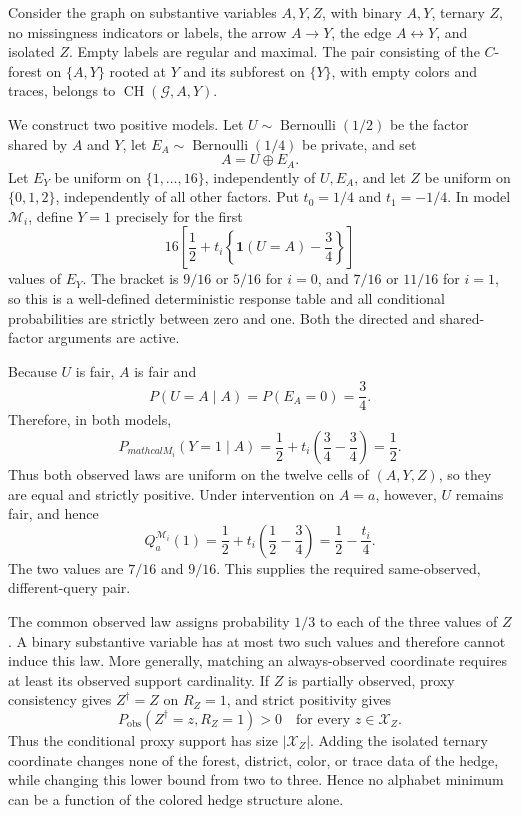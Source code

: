 Consider the graph on substantive variables \(A,Y,Z\), with binary \(A,Y\), ternary \(Z\), no missingness indicators or labels, the arrow \(A\to Y\), the edge \(A\leftrightarrow Y\), and isolated \(Z\). Empty labels are regular and maximal. The pair consisting of the \(C\)-forest on \(\{A,Y\}\) rooted at \(Y\) and its subforest on \(\{Y\}\), with empty colors and traces, belongs to \(\operatorname{CH}(\mathcal G,A,Y)\).

We construct two positive models. Let \(U\sim\operatorname{Bernoulli}(1/2)\) be the factor shared by \(A\) and \(Y\), let \(E_A\sim\operatorname{Bernoulli}(1/4)\) be private, and set
\[
A=U\mathbin{\oplus}E_A.
\]
Let \(E_Y\) be uniform on \(\{1,\ldots,16\}\), independently of \(U,E_A\), and let \(Z\) be uniform on \(\{0,1,2\}\), independently of all other factors. Put \(t_0=1/4\) and \(t_1=-1/4\). In model \(\mathcal M_i\), define \(Y=1\) precisely for the first
\[
16\left[\frac12+t_i\left\{\mathbf 1(U=A)-\frac34\right\}\right]
\]
values of \(E_Y\). The bracket is \(9/16\) or \(5/16\) for \(i=0\), and \(7/16\) or \(11/16\) for \(i=1\), so this is a well-defined deterministic response table and all conditional probabilities are strictly between zero and one. Both the directed and shared-factor arguments are active.

Because \(U\) is fair, \(A\) is fair and
\[
P(U=A\mid A)=P(E_A=0)=\frac34.
\]
Therefore, in both models,
\[
P_{mathcal M_i}(Y=1\mid A)
=\frac12+t_i\left(\frac34-\frac34\right)=\frac12.
\]
Thus both observed laws are uniform on the twelve cells of \((A,Y,Z)\), so they are equal and strictly positive. Under intervention on \(A=a\), however, \(U\) remains fair, and hence
\[
Q_a^{\mathcal M_i}(1)
=\frac12+t_i\left(\frac12-\frac34\right)
=\frac12-\frac{t_i}{4}.
\]
The two values are \(7/16\) and \(9/16\). This supplies the required same-observed, different-query pair.

The common observed law assigns probability \(1/3\) to each of the three values of \(Z\). A binary substantive variable has at most two such values and therefore cannot induce this law. More generally, matching an always-observed coordinate requires at least its observed support cardinality. If \(Z\) is partially observed, proxy consistency gives \(Z^{\dagger}=Z\) on \(R_Z=1\), and strict positivity gives
\[
P_{\mathrm{obs}}(Z^{\dagger}=z,R_Z=1)>0
\quad\text{for every }z\in\mathcal X_Z.
\]
Thus the conditional proxy support has size \(|\mathcal X_Z|\). Adding the isolated ternary coordinate changes none of the forest, district, color, or trace data of the hedge, while changing this lower bound from two to three. Hence no alphabet minimum can be a function of the colored hedge structure alone.